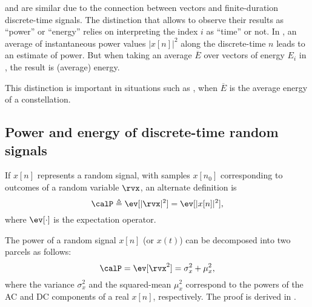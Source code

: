  and  are similar due to the connection between vectors and finite-duration discrete-time signals. The distinction that allows to observe their results as ``power'' or ``energy'' relies on interpreting the index $i$ as ``time'' or not.
In , an average of instantaneous power values $|x[n]|^2$ along the discrete-time $n$ leads to an estimate of power. But when taking an average $\overline E$ over vectors of energy $E_i$ in , the result is (average) energy. 

\ifml
\else
This distinction is important in situations such as  , when $\overline E$ is the average energy of a constellation.
\fi



\subsection{Power and energy of discrete-time random signals}

If $x[n]$ represents a random signal, with samples $x[n_0]$ corresponding to outcomes of a
random variable $\rvx$,  an alternate definition is
\[\calP \triangleq \ev[|\rvx|^2] = \ev [| x[n] |^2],\]
where $\ev [\cdot]$ is the expectation operator.


The power of a random signal $x[n]$ (or $x(t)$) can be decomposed into two parcels as follows:
\begin{equation}
\calP = \ev [\rvx^2] = \sigma_x^2 + \mu_x^2,
	\label{eq:powerasexpectedvalue}
\end{equation}
where the variance $\sigma_x^2$ and the squared-mean $\mu_x^2$ correspond to the powers of the AC and DC components of a real $x[n]$, respectively.
The proof is derived in . 

